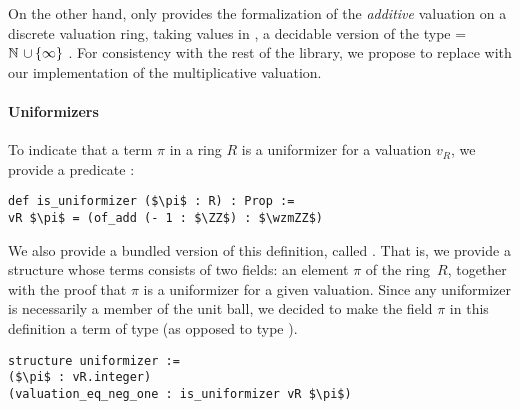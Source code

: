\documentclass[sigplan,screen]{acmart}
\begin{document}
On the other hand, \mathlib only provides the formalization of the \emph{additive} valuation \href{https://leanprover-community.github.io/mathlib_docs/ring_theory/discrete_valuation_ring/basic.html#discrete_valuation_ring.add_val}{\extlink} on a discrete valuation ring, taking values in , a decidable version of the type =\,$\mathbb{N}\mathtt{\ \cup \,\{\infty\}\ }$. 
For consistency with the rest of the library, we propose to replace  with our implementation of the multiplicative valuation.


\paragraph{Uniformizers}
To indicate that a term \code{(}$\pi$ in a ring $R$ is a uniformizer for a valuation $v_R$, we provide a predicate \href{https://github.com/mariainesdff/local_fields_journal/blob/0b408ff3af36e18f991f9d4cb87be3603cfc3fc3/src/discrete_valuation_ring/basic.lean#L137}{\extlink}:
\begin{lstlisting}
def is_uniformizer ($\pi$ : R) : Prop := 
vR $\pi$ = (of_add (- 1 : $\ZZ$) : $\wzmZZ$)
\end{lstlisting}

We also provide a bundled version of this definition, called \href{https://github.com/mariainesdff/local_fields_journal/blob/0b408ff3af36e18f991f9d4cb87be3603cfc3fc3/src/discrete_valuation_ring/basic.lean#L148}{\extlink}. That is, we provide a structure \relax whose terms consists of two fields: an element $\pi$ of the ring~$R$, together with the proof that $\pi$ is a uniformizer for a given valuation. Since any uniformizer is necessarily a member of the unit ball, we decided to make the field $\pi$ in this definition a term of type  (as opposed to type ).
\begin{lstlisting}
structure uniformizer :=
($\pi$ : vR.integer)
(valuation_eq_neg_one : is_uniformizer vR $\pi$)
\end{lstlisting}
\end{document}
